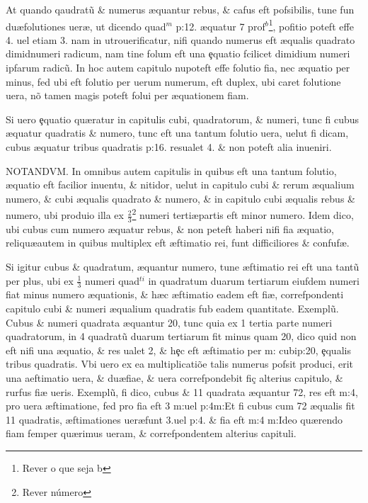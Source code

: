 At quando qaudrat\~{u} \& numerus {\ae}quantur rebus, \& cafus eft pofsibilis, tune fun du\ae folutiones uer{\ae}, ut dicendo quad\(^{m}\) p:12. {\ae}quatur 7 prof\(^b \)\footnote{Rever o que seja b}, pofitio poteft effe 4. uel etiam 3. nam in utro\que uerificatur, nifi quando numerus eft {\ae}qualis quadrato dimid\nb numeri radicum, nam tine folum eft una \c{e}quatio fcilicet dimidium numeri ipfarum radic\~{u}. In hoc autem capitulo nu\que poteft effe folutio fi{\ct}a, nec {\ae}quatio per minus, fed ubi eft folutio per uerum numerum, eft duplex, ubi caret folutione uera, n\~{o} tamen magis poteft folui per {\ae}quationem fi{\ct}am.

 Si uero \c{e}quatio qu{\ae}ratur in capitulis cubi, quadratorum, \& numeri, tunc fi cubus {\ae}quatur quadratis \& numero, tunc eft una tantum folutio uera, uelut fi dicam, cubus {\ae}quatur tribus quadratis p:16. resualet 4. \& non poteft alia inueniri.

 NOTANDVM. In omnibus autem capitulis in quibus eft una tantum folutio, {\ae}quatio eft facilior inuentu, \& nitidor, uelut in capitulo cubi \& rerum {\ae}qualium numero, \& cubi {\ae}qualis quadrato \& numero, \& in capitulo cubi {\ae}qualis rebus \& numero, ubi produ{\ct}io illa ex \( \tfrac{2}{3} \)\footnote{Rever número} numeri \rdois terti\ae partis eft minor numero. Idem dico, ubi cubus cum numero {\ae}quatur rebus, \& non peteft haberi nifi fi{\ct}a {\ae}quatio, reliqu\ae autem in quibus multiplex eft {\ae}ftimatio rei, funt difficiliores \& confuf{\ae}.

Si igitur cubus \& quadratum, {\ae}quantur numero, tune {\ae}ftimatio rei eft una tant\~{u} per plus, ubi ex \( \tfrac{1}{3} \) numeri quad\(^{ti}\) in quadratum duarum tertiarum eiufdem numeri fiat minus numero {\ae}quationis, \& h{\ae}c {\ae}ftimatio eadem eft fi{\ct\ae}, correfpondenti capitulo cubi \& numeri {\ae}qualium quadratis fub eadem quantitate. Exempl\~{u}. Cubus \& numeri quadrata {\ae}quantur 20, tunc quia ex 1 tertia parte numeri quadratorum, in 4 quadrat\~{u} duarum tertiarum fit minus quam 20, dico quid non eft nifi una {\ae}quatio, \& res ualet 2, \& h\c{e}c eft {\ae}ftimatio per m: cubip:20, \c{e}qualis tribus quadratis. Vbi uero ex ea multiplicati\~{o}e talis numerus pofsit produci, erit una {ae}ftimatio uera, \& du\ae fi{\ct}ae, \& uera correfpondebit fi{\ct}\c{c} alterius capitulo, \& rurfus fi{\ct\ae} ueris. Exempl\~{u}, fi dico, cubus \& 11 quadrata {\ae}quantur 72, res eft  m:4, pro uera {\ae}ftimatione, fed pro fi{\ct}a eft 3 m:uel  p:4m:Et fi cubus cum 72 {\ae}qualis fit 11 quadratis, {\ae}ftimationes uer\ae funt 3.uel  p:4. \& fi{\ct}a eft  m:4 m:Ideo qu{\ae}rendo fi{\ct}am femper qu{\ae}rimus ueram, \& correfpondentem alterius capituli.


